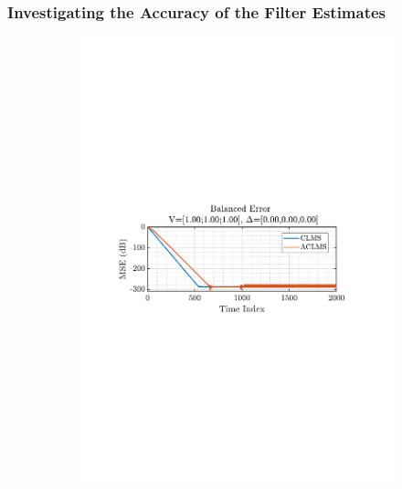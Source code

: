 \documentclass[12pt]{article}
\begin{document}
		\subsubsection{Investigating the Accuracy of the Filter Estimates}
			\begin{figure}[H]
				\centering
				\begin{subfigure}{0.49\textwidth}
					\centering
					\includegraphics[trim={2.2cm 11.2cm 3.00cm  11.2cm}, clip, width=\textwidth]{../MATLAB/figures/q3_1e_fig01.pdf} 
					\captionsetup{justification=centering}
				\end{subfigure}
				\begin{subfigure}{0.49\textwidth}
					\centering

\end{subfigure}
\end{figure}
\end{document}
